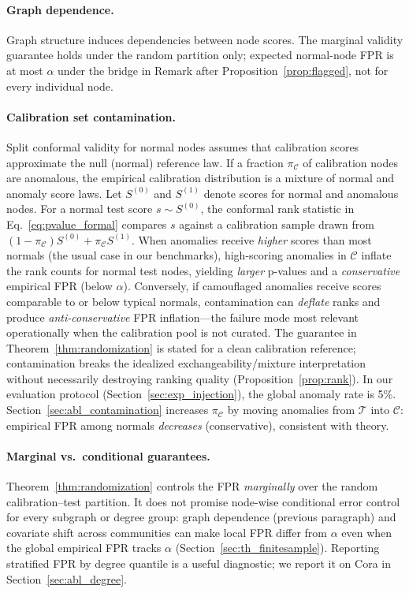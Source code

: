 \documentclass[a4paper]{cas-dc}
\theoremstyle{definition}
\begin{document}
\paragraph{Graph dependence.}
Graph structure induces dependencies between node scores.  The marginal validity guarantee holds under the {random partition} only; expected normal-node FPR is at most $\alpha$ under the bridge in Remark after Proposition~\ref{prop:flagged}, not for every individual node.

\paragraph{Calibration set contamination.}
Split conformal validity for normal nodes assumes that calibration scores approximate the null (normal) reference law.  If a fraction $\pi_{\mathcal{C}}$ of calibration nodes are anomalous, the empirical calibration distribution is a mixture of normal and anomaly score laws.  Let $S^{(0)}$ and $S^{(1)}$ denote scores for normal and anomalous nodes.  For a normal test score $s \sim S^{(0)}$, the conformal rank statistic in Eq.~\eqref{eq:pvalue_formal} compares $s$ against a calibration sample drawn from $(1-\pi_{\mathcal{C}})S^{(0)} + \pi_{\mathcal{C}} S^{(1)}$.  When anomalies receive \emph{higher} scores than most normals (the usual case in our benchmarks), high-scoring anomalies in $\mathcal{C}$ inflate the rank counts for normal test nodes, yielding \emph{larger} p-values and a \emph{conservative} empirical FPR (below $\alpha$).  Conversely, if camouflaged anomalies receive scores comparable to or below typical normals, contamination can \emph{deflate} ranks and produce \emph{anti-conservative} FPR inflation---the failure mode most relevant operationally when the calibration pool is not curated.  The guarantee in Theorem~\ref{thm:randomization} is stated for a clean calibration reference; contamination breaks the idealized exchangeability/mixture interpretation without necessarily destroying ranking quality (Proposition~\ref{prop:rank}).
In our evaluation protocol (Section~\ref{sec:exp_injection}), the global anomaly rate is 5\%.  Section~\ref{sec:abl_contamination} increases $\pi_{\mathcal{C}}$ by moving anomalies from $\mathcal{T}$ into $\mathcal{C}$: empirical FPR among normals \emph{decreases} (conservative), consistent with theory.
\paragraph{Marginal vs.\ conditional guarantees.}
Theorem~\ref{thm:randomization} controls the FPR \emph{marginally} over the random calibration--test partition.  It does not promise node-wise conditional error control for every subgraph or degree group: graph dependence (previous paragraph) and covariate shift across communities can make local FPR differ from $\alpha$ even when the global empirical FPR tracks $\alpha$ (Section~\ref{sec:th_finitesample}).  Reporting stratified FPR by degree quantile is a useful diagnostic; we report it on Cora in Section~\ref{sec:abl_degree}.
\end{document}
